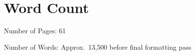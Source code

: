 \chapter*{Word Count}

Number of Pages: 61

\noindent Number of Words: Approx.\ 13,500 before final formatting pass
